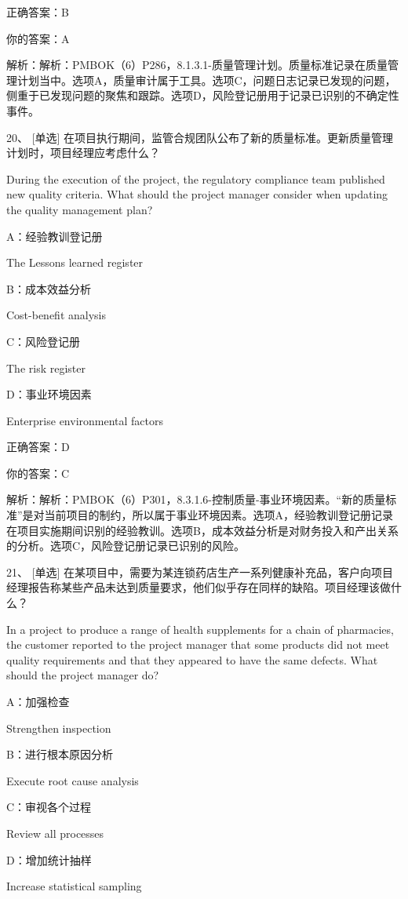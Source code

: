 正确答案：B

你的答案：A

解析：解析：PMBOK（6）P286，8.1.3.1-质量管理计划。质量标准记录在质量管理计划当中。选项A，质量审计属于工具。选项C，问题日志记录已发现的问题，侧重于已发现问题的聚焦和跟踪。选项D，风险登记册用于记录已识别的不确定性事件。


20、 [单选] 在项目执行期间，监管合规团队公布了新的质量标准。更新质量管理计划时，项目经理应考虑什么？

During the execution of the project, the regulatory compliance team published new quality criteria. What should the project manager consider when updating the quality management plan?

A：经验教训登记册

The Lessons learned register

B：成本效益分析

Cost-benefit analysis

C：风险登记册

The risk register

D：事业环境因素

Enterprise environmental factors

正确答案：D

你的答案：C

解析：解析：PMBOK（6）P301，8.3.1.6-控制质量-事业环境因素。“新的质量标准”是对当前项目的制约，所以属于事业环境因素。选项A，经验教训登记册记录在项目实施期间识别的经验教训。选项B，成本效益分析是对财务投入和产出关系的分析。选项C，风险登记册记录已识别的风险。



21、 [单选] 在某项目中，需要为某连锁药店生产一系列健康补充品，客户向项目经理报告称某些产品未达到质量要求，他们似乎存在同样的缺陷。项目经理该做什么？

In a project to produce a range of health supplements for a chain of pharmacies, the customer reported to the project manager that some products did not meet quality requirements and that they appeared to have the same defects. What should the project manager do?

A：加强检查

Strengthen inspection

B：进行根本原因分析

Execute root cause analysis

C：审视各个过程

Review all processes

D：增加统计抽样

Increase statistical sampling


